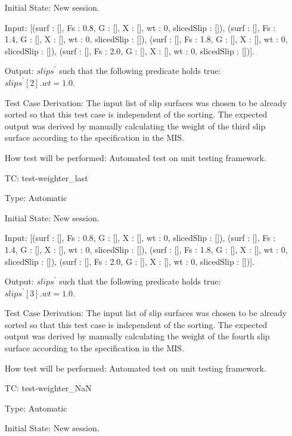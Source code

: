 \documentclass[12pt, titlepage]{article}
\newcounter{utestnum} %
\begin{document}
\begin{enumerate}[label=TC\arabic*:,ref={\arabic*}]
	Initial State: New session.
	
	Input: [(surf : [], Fs : 0.8, G : [], X : [], wt : 0, slicedSlip : []), 
	(surf : [], Fs : 1.4, G : [], X : [], wt : 0, slicedSlip : []), 
	(surf : [], Fs : 1.8, G : [], X : [], wt : 0, slicedSlip : []), 
	(surf : [], Fs : 2.0, G : [], X : [], wt : 0, slicedSlip : [])].
	
	Output: $\textit{slips}^\prime$ such that the following predicate holds 
	true:\\ 
	$\textit{slips}^\prime[2].wt = 1.0$.
	
	Test Case Derivation: The input list of slip surfaces was chosen to be 
	already 
	sorted so that this test case is independent of the sorting. The expected 
	output was derived by manually calculating the weight of the third slip 
	surface according to the specification in the MIS.
	
	How test will be performed: Automated test on unit testing framework.
	
	\item [TC\refstepcounter{utestnum}\theutestnum: \label{TC_WeighterLast}] 
	test-weighter\_last
	
	Type: Automatic
	
	Initial State: New session.
	
	Input: [(surf : [], Fs : 0.8, G : [], X : [], wt : 0, slicedSlip : []), 
	(surf : [], Fs : 1.4, G : [], X : [], wt : 0, slicedSlip : []), 
	(surf : [], Fs : 1.8, G : [], X : [], wt : 0, slicedSlip : []), 
	(surf : [], Fs : 2.0, G : [], X : [], wt : 0, slicedSlip : [])].
	
	Output: $\textit{slips}^\prime$ such that the following predicate holds 
	true:\\ 
	$\textit{slips}^\prime[3].wt = 1.0$.
	
	Test Case Derivation: The input list of slip surfaces was chosen to be 
	already 
	sorted so that this test case is independent of the sorting. The expected 
	output was derived by manually calculating the weight of the fourth slip 
	surface according to the specification in the MIS.
	
	How test will be performed: Automated test on unit testing framework.
	
	\item [TC\refstepcounter{utestnum}\theutestnum: \label{TC_WeighterNaN}] 
	test-weighter\_NaN
	
	Type: Automatic
	
	Initial State: New session.
	

\end{enumerate}
\end{document}
